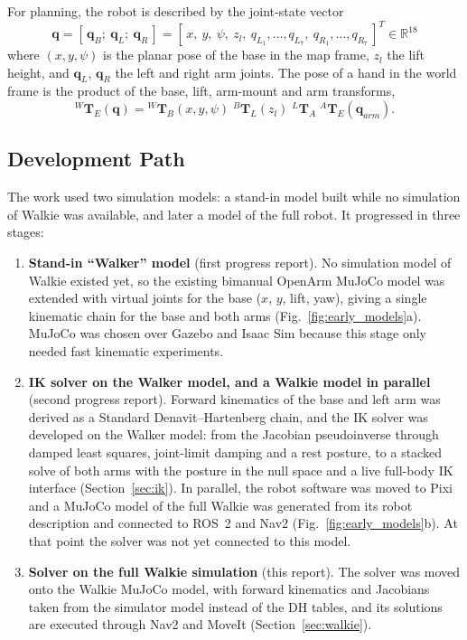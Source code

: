 \documentclass[12pt,a4paper]{article}
\begin{document}
For planning, the robot is described by the joint-state vector
\begin{equation}
    \mathbf{q} = [\,\mathbf{q}_B;\ \mathbf{q}_L;\ \mathbf{q}_R\,]
    = [\,x,\ y,\ \psi,\ z_l,\ q_{L_1},\dots,q_{L_7},\ q_{R_1},\dots,q_{R_7}\,]^{T}\in\mathbb{R}^{18}
    \label{eq:q18}
\end{equation}
where $(x, y, \psi)$ is the planar pose of the base in the map frame, $z_l$ the lift height, and
$\mathbf{q}_L$, $\mathbf{q}_R$ the left and right arm joints. The pose of a hand in the world frame is
the product of the base, lift, arm-mount and arm transforms,
\begin{equation}
    {}^{W}\mathbf{T}_{E}(\mathbf{q}) = {}^{W}\mathbf{T}_{B}(x,y,\psi)\;{}^{B}\mathbf{T}_{L}(z_l)\;
    {}^{L}\mathbf{T}_{A}\;{}^{A}\mathbf{T}_{E}(\mathbf{q}_{arm}).
    \label{eq:chain}
\end{equation}

\subsection{Development Path}

The work used two simulation models: a stand-in model built while no simulation of Walkie was
available, and later a model of the full robot. It progressed in three stages:
\begin{enumerate}
    \item \textbf{Stand-in ``Walker'' model} (first progress report). No simulation model of
          Walkie existed yet, so the existing bimanual OpenArm MuJoCo model was extended with
          virtual joints for the base ($x$, $y$, lift, yaw), giving a single kinematic chain for
          the base and both arms (Fig.~\ref{fig:early_models}a). MuJoCo was chosen over Gazebo
          and Isaac Sim because this stage only needed fast kinematic experiments.
    \item \textbf{IK solver on the Walker model, and a Walkie model in parallel} (second progress
          report). Forward kinematics of the base and left arm was derived as a Standard
          Denavit--Hartenberg chain, and the IK solver was developed on the Walker model: from the
          Jacobian pseudoinverse through damped least squares, joint-limit damping and a rest
          posture, to a stacked solve of both arms with the posture in the null space and a live
          full-body IK interface (Section~\ref{sec:ik}). In parallel, the robot software was moved
          to Pixi and a MuJoCo model of the full Walkie was generated from its robot description
          and connected to ROS~2 and Nav2 (Fig.~\ref{fig:early_models}b). At that point the solver
          was not yet connected to this model.
    \item \textbf{Solver on the full Walkie simulation} (this report). The solver was moved onto the
          Walkie MuJoCo model, with forward kinematics and Jacobians taken from the simulator model
          instead of the DH tables, and its solutions are executed through Nav2 and MoveIt
          (Section~\ref{sec:walkie}).
\end{enumerate}
\end{document}
